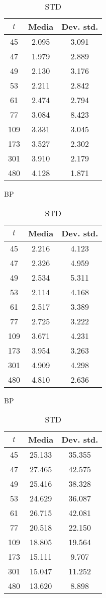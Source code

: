 \begin{table}[ht]
\centering
\begin{subtable}{0.33\textwidth}
\centering
{\tablecolors
\begin{tabular}{|c|c|c|}
\hline
$t$ & Media & Dev. std. \\
\hline
45 & 2.095 & 3.091 \\
\hline
47 & 1.979 & 2.889 \\
\hline
49 & 2.130 & 3.176 \\
\hline
53 & 2.211 & 2.842 \\
\hline
61 & 2.474 & 2.794 \\
\hline
77 & 3.084 & 8.423 \\
\hline
109 & 3.331 & 3.045 \\
\hline
173 & 3.527 & 2.302 \\
\hline
301 & 3.910 & 2.179 \\
\hline
480 & 4.128 & 1.871 \\
\hline
\end{tabular}}
\caption{\uo{} BP}
\end{subtable}%
\begin{subtable}{0.33\textwidth}
\centering
{\tablecolors
\begin{tabular}{|c|c|c|}
\hline
$t$ & Media & Dev. std. \\
\hline
45 & 2.216 & 4.123 \\
\hline
47 & 2.326 & 4.959 \\
\hline
49 & 2.534 & 5.311 \\
\hline
53 & 2.114 & 4.168 \\
\hline
61 & 2.517 & 3.389 \\
\hline
77 & 2.725 & 3.222 \\
\hline
109 & 3.671 & 4.231 \\
\hline
173 & 3.954 & 3.263 \\
\hline
301 & 4.909 & 4.298 \\
\hline
480 & 4.810 & 2.636 \\
\hline
\end{tabular}}
\caption{\pp{} BP}
\end{subtable}%
\begin{subtable}{0.33\textwidth}
\centering
{\tablecolors
\begin{tabular}{|c|c|c|}
\hline
$t$ & Media & Dev. std. \\
\hline
45 & 25.133 & 35.355 \\
\hline
47 & 27.465 & 42.575 \\
\hline
49 & 25.416 & 38.328 \\
\hline
53 & 24.629 & 36.087 \\
\hline
61 & 26.715 & 42.081 \\
\hline
77 & 20.518 & 22.150 \\
\hline
109 & 18.805 & 19.564 \\
\hline
173 & 15.111 & 9.707 \\
\hline
301 & 15.047 & 11.252 \\
\hline
480 & 13.620 & 8.898 \\
\hline
\end{tabular}}
\caption{\uo{} STD}
\end{subtable}


\end{table}
